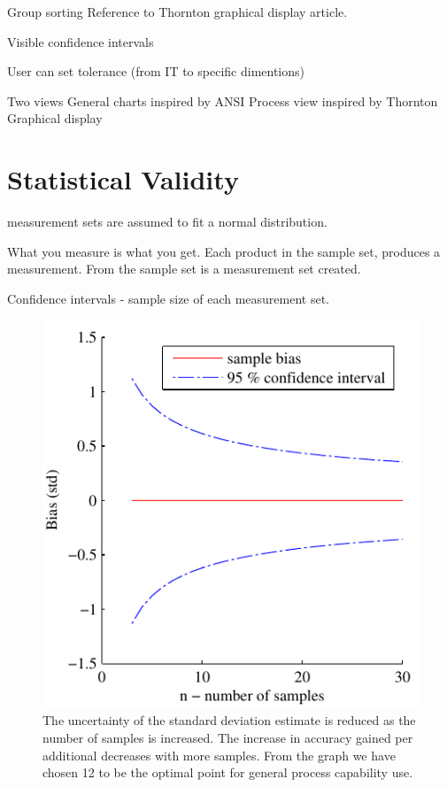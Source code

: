 \documentclass[aip,amsmath, reprint, author-year]{revtex4-1}
\begin{document}
	Group sorting
		Reference to Thornton graphical display article.

	Visible confidence intervals

	User can set tolerance (from IT to specific dimentions)

Two views
	General charts inspired by ANSI
	Process view inspired by Thornton Graphical display


\section{Statistical Validity}

measurement sets are assumed to fit a normal distribution.

What you measure is what you get.
Each product in the sample set, produces a measurement. From the sample set is a  measurement set created. 

Confidence intervals - sample size of each measurement set.

\begin{figure}
\includegraphics{stats_bias_confidence.pdf}
\caption{\label{fig:std_uncertainty}The uncertainty of the standard deviation estimate is reduced as the number of samples is increased. The increase in accuracy gained per additional decreases with more samples. From the graph we have chosen 12 to be the optimal point for general process capability use.}
\end{figure}
\end{document}
